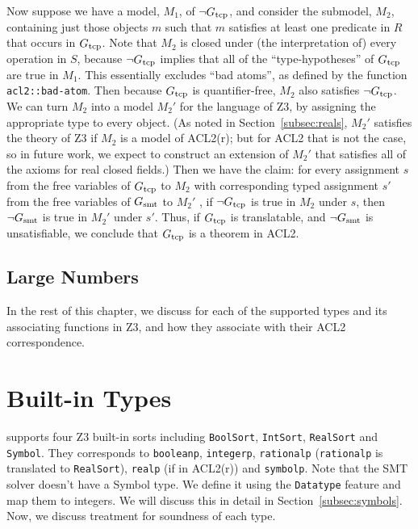  Now suppose we have a model, $M_1$, of $\neg G_{\mathrm{tcp}}$, and consider
the submodel, $M_2$, containing just those objects $m$ such that $m$ satisfies
at least one predicate in $R$ that occurs in $G_{\mathrm{tcp}}$.
Note that $M_2$ is closed under (the interpretation of) every operation in $S$,
because $\neg G_{\mathrm{tcp}}$ implies that all of the ``type-hypotheses'' of $G_{\mathrm{tcp}}$ are
true in $M_1$.
This essentially excludes ``bad atoms'', as defined by the function
\texttt{acl2::bad-atom}.
Then because $G_{\mathrm{tcp}}$ is quantifier-free, $M_2$ also satisfies $\neg G_{\mathrm{tcp}}$.
We can turn $M_2$ into a model $M_2'$ for the language of Z3, by
assigning the appropriate type to every object.
(As noted in Section~\ref{subsec:reals}, $M_2'$ satisfies the theory of
Z3 if $M_2$ is a model of ACL2(r); but for ACL2 that is not the
case, so in future work, we expect to construct an extension of $M_2'$ that
satisfies all of the axioms for real closed fields.)
Then we have the claim: for every assignment $s$ from the free variables of
$G_{\mathrm{tcp}}$ to $M_2$ with corresponding typed assignment $s'$ from the free
variables of $G_{\mathrm{smt}}$ to $M_2'$ , if $\neg G_{\mathrm{tcp}}$ is true in $M_2$ under $s$,
then $\neg G_{\mathrm{smt}}$ is true in $M_2'$ under $s'$.
Thus, if $G_{\mathrm{tcp}}$ is translatable, and $\neg G_{\mathrm{smt}}$ is unsatisfiable, we conclude
that $G_{\mathrm{tcp}}$ is a theorem in ACL2.

\subsection{Large Numbers}

In the rest of this chapter, we discuss for each of the supported types and its
associating functions in Z3, and how they associate with their ACL2
correspondence.

\section{Built-in Types}\label{sec:soundbuiltin}
\smtlink{} supports four Z3 built-in sorts including \texttt{BoolSort},
\texttt{IntSort}, \texttt{RealSort} and \texttt{Symbol}.
They corresponds to \texttt{booleanp}, \texttt{integerp}, \texttt{rationalp}
(\texttt{rationalp} is translated to \texttt{RealSort}), \texttt{realp} (if in
ACL2(r)) and \texttt{symbolp}.
Note that the \acs{SMT} solver doesn't have a Symbol type.
We define it using the \texttt{Datatype} feature and map them to integers.
We will discuss this in detail in Section~\ref{subsec:symbols}.
Now, we discuss treatment for soundness of each type.

